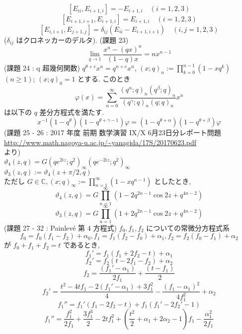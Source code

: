 \documentclass{article}
\begin{document}
\[ [E_{ii}, E_{i+1,i}] = -E_{i+1,i} \quad (i=1,2,3) \]
\[ [E_{i+1,i+1}, E_{i+1,i}] = E_{i+1,i} \quad (i=1,2,3) \]
\[ [E_{i,i+1}, E_{j+1,j}] = \delta_{ij} (E_{ii} - E_{i+1,i+1}) \quad (i,j=1,2,3) \]
($\delta_{ij}$ はクロネッカーのデルタ).
(課題 23)
\[ \lim_{q \to 1} \frac{x^n - (qx)^n}{(1 - q)x} = nx^{n-1} \]
\newpage \noindent
(課題 24 : q 超幾何関数) $q^{\theta+c}x^n = q^{n+c}x^n$, $(x;q)_{n} := \prod^{n-1}_{k=0}(1-xq^k)$ $(n \geq 1)$; $(x;q)_0=1$ とする. このとき
\[ \varphi(x) = \sum^{\infty}_{n=0} \frac{(q^{\alpha};q)_n(q^{\beta};q)_n}{(q^{\gamma};q)_n(q;q)_n}x^n \]
は以下の $q$ 差分方程式を満たす.
\[ x^{-1}(1-q^{\theta})(1-q^{\theta+\gamma-1})\varphi = (1-q^{\theta+\alpha})(1-q^{\theta+\beta})\varphi \]
(課題 25 - 26 : 2017 年度 前期 数学演習 IX/X 6月23日分レポート問題\\
\url{http://www.math.nagoya-u.ac.jp/~yanagida/17S/20170623.pdf}\\
より)\\
$\vartheta_4(z,q) = G(qe^{2iz};q^2)_{\infty}(qe^{-2iz};q^2)_{\infty}$\\
$\vartheta_3(z,q) := \vartheta_4(z+\pi/2,q)$\\
ただし $G \in \mathbb{C}, (x;q)_{\infty} := \prod^{\infty}_{n=1} (1 - xq^{n-1})$ としたとき,
\[ \vartheta_4(z,q) = G \prod^{\infty}_{n=1}(1-2q^{2n-1}\cos{2z}+q^{4n-2}) \]
\[ \vartheta_3(z,q) = G \prod^{\infty}_{n=1}(1+2q^{2n-1}\cos{2z}+q^{4n-2}) \]
(課題 27 - 32 : Painlev\'e 第 4 方程式) $f_0,f_1,f_2$ についての常微分方程式系
\[ f_0 = f_0(f_1-f_2)+\alpha_0, f_1 = f_1(f_2-f_0)+\alpha_1, f_2 = f_2(f_0-f_1)+\alpha_2 \]
が $f_0 + f_1 + f_2 = t$ であるとき, 
\[ f_1' = f_1(f_1 + 2f_2- t) + \alpha_1 \]
\[ f_2' = f_2(t - 2f_1 - f_2) + \alpha_2 \]
\[ f_2 = \frac{(f_1' - \alpha_1)}{2f_1} + \frac{(t-f_1)}{2} \]
\[ f_2' = \frac{t^2 - 4tf_1 - 2(f_1' - \alpha_1) + 3f_1^2}{4} - \frac{(f_1 - \alpha_1)^2}{4f_1^2} + \alpha_2 \]
\[ f_1'' = f_1'(f_1 - 2f_2 - t) + f_1(f_1' - 2f_2' - 1) \]
\[ f_1'' = \frac{f_1^2}{2f_1} + \frac{3f_1^3}{2} - 2tf_1^2 + \left(\frac{t^2}{2} + \alpha_1 + 2\alpha_2 - 1 \right)f_1 - \frac{\alpha_1^2}{2f_1} \]
\end{document}
